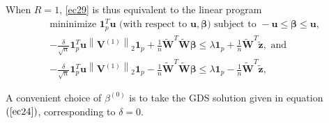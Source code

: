 \documentclass[a4paper,12pt,openany]{report}
\theoremstyle{plain}
\theoremstyle{plain}
\theoremstyle{plain}
\theoremstyle{plain}
\theoremstyle{plain}
\theoremstyle{plain}
\theoremstyle{plain}
\theoremstyle{plain}
\theoremstyle{plain}
\theoremstyle{plain}
\theoremstyle{plain}
\theoremstyle{plain}
\begin{document}
When $R=1$, \eqref{ec29} is thus equivalent to the linear program
\begin{align*}
&\text{mininimize } \mathbf{1}_{p}^{T} \mathbf{u}\text{ (with respect to } \mathbf{u}, \boldsymbol{\beta} \text{)} \text{ subject to } -\mathbf{u} \leq \boldsymbol{\beta} \leq \mathbf{u}, \\
&- \frac{\delta}{\sqrt{n}} \mathbf{1}_{p}^{T} \mathbf{u}\left\|\mathbf{V}^{(1)}\right\|_{2}\mathbf{1}_{p}+ \frac{1}{n}\tilde{\mathbf{W}}^{T}\tilde{\mathbf{W}} \boldsymbol{\beta} \leq  \lambda \mathbf{1}_{p}+ \frac{1}{n}\tilde{\mathbf{W}}^{T} \tilde{\mathbf{z}}, \text{ and}\\
&-\frac{\delta}{\sqrt{n}} \mathbf{1}_{p}^{T} \mathbf{u}\left\|\mathbf{V}^{(1)}\right\|_{2}\mathbf{1}_{p}- \frac{1}{n}\tilde{\mathbf{W}}^{T}\tilde{\mathbf{W}} \boldsymbol{\beta} \leq  \lambda \mathbf{1}_{p}- \frac{1}{n}\tilde{\mathbf{W}}^{T} \tilde{\mathbf{z}},
\end{align*}


A convenient choice of $\beta^{(0)}$ is to take the GDS solution given in equation $(\ref{ec24})$, corresponding to $\delta=0$.
\end{document}
